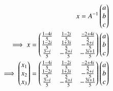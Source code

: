 \begin{align}
x = A^{-1} \begin{pmatrix}a\\b\\c\end{pmatrix}\\
\implies x = \begin{pmatrix}\frac{1-4i}{5} & \frac{1-2i}{5} & \frac{-2+4i}{5}\\\frac{1-2i}{5} & \frac{1+3i}{5} & -\frac{2+i}{5}\\\frac{3-i}{5} & -\frac{2+i}{5} & -\frac{3i+1}{5}\end{pmatrix}\begin{pmatrix}a\\b\\c\end{pmatrix}\\
\implies \begin{pmatrix}x_1\\x_2\\x_3\end{pmatrix} =  \begin{pmatrix}\frac{1-4i}{5} & \frac{1-2i}{5} & \frac{-2+4i}{5}\\\frac{1-2i}{5} & \frac{1+3i}{5} & -\frac{2+i}{5}\\\frac{3-i}{5} & -\frac{2+i}{5} & -\frac{3i+1}{5}\end{pmatrix}\begin{pmatrix}a\\b\\c\end{pmatrix}
\end{align}




